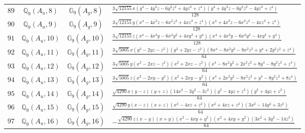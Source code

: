 \documentclass[fleqn,8pt,landscape]{jsarticle}
\begin{document}
\begin{table}[ht!]
\begin{center}
\begin{tabular}{cccl}
$ 89 $ & $ \mathbb{Q}_{9}(A_{u},8) $ & $ \mathbb{G}_{9}(A_{g},8) $ & $ \frac{3 \sqrt{12155} x \left(y^{4} - 4 y^{3} z - 6 y^{2} z^{2} + 4 y z^{3} + z^{4}\right) \left(y^{4} + 4 y^{3} z - 6 y^{2} z^{2} - 4 y z^{3} + z^{4}\right)}{128} $ \\
$ 90 $ & $ \mathbb{Q}_{9}(A_{u},9) $ & $ \mathbb{G}_{9}(A_{g},9) $ & $ \frac{3 \sqrt{12155} y \left(x^{4} - 4 x^{3} z - 6 x^{2} z^{2} + 4 x z^{3} + z^{4}\right) \left(x^{4} + 4 x^{3} z - 6 x^{2} z^{2} - 4 x z^{3} + z^{4}\right)}{128} $ \\
$ 91 $ & $ \mathbb{Q}_{9}(A_{u},10) $ & $ \mathbb{G}_{9}(A_{g},10) $ & $ \frac{3 \sqrt{12155} z \left(x^{4} - 4 x^{3} y - 6 x^{2} y^{2} + 4 x y^{3} + y^{4}\right) \left(x^{4} + 4 x^{3} y - 6 x^{2} y^{2} - 4 x y^{3} + y^{4}\right)}{128} $ \\
$ 92 $ & $ \mathbb{Q}_{9}(A_{u},11) $ & $ \mathbb{G}_{9}(A_{g},11) $ & $ \frac{3 \sqrt{5005} x \left(y^{2} - 2 y z - z^{2}\right) \left(y^{2} + 2 y z - z^{2}\right) \left(8 x^{4} - 8 x^{2} y^{2} - 8 x^{2} z^{2} + y^{4} + 2 y^{2} z^{2} + z^{4}\right)}{64} $ \\
$ 93 $ & $ \mathbb{Q}_{9}(A_{u},12) $ & $ \mathbb{G}_{9}(A_{g},12) $ & $ \frac{3 \sqrt{5005} y \left(x^{2} - 2 x z - z^{2}\right) \left(x^{2} + 2 x z - z^{2}\right) \left(x^{4} - 8 x^{2} y^{2} + 2 x^{2} z^{2} + 8 y^{4} - 8 y^{2} z^{2} + z^{4}\right)}{64} $ \\
$ 94 $ & $ \mathbb{Q}_{9}(A_{u},13) $ & $ \mathbb{G}_{9}(A_{g},13) $ & $ \frac{3 \sqrt{5005} z \left(x^{2} - 2 x y - y^{2}\right) \left(x^{2} + 2 x y - y^{2}\right) \left(x^{4} + 2 x^{2} y^{2} - 8 x^{2} z^{2} + y^{4} - 8 y^{2} z^{2} + 8 z^{4}\right)}{64} $ \\
$ 95 $ & $ \mathbb{Q}_{9}(A_{u},14) $ & $ \mathbb{G}_{9}(A_{g},14) $ & $ \frac{\sqrt{4290} x \left(y - z\right) \left(y + z\right) \left(14 x^{2} - 3 y^{2} - 3 z^{2}\right) \left(y^{2} - 4 y z + z^{2}\right) \left(y^{2} + 4 y z + z^{2}\right)}{64} $ \\
$ 96 $ & $ \mathbb{Q}_{9}(A_{u},15) $ & $ \mathbb{G}_{9}(A_{g},15) $ & $ \frac{\sqrt{4290} y \left(x - z\right) \left(x + z\right) \left(x^{2} - 4 x z + z^{2}\right) \left(x^{2} + 4 x z + z^{2}\right) \left(3 x^{2} - 14 y^{2} + 3 z^{2}\right)}{64} $ \\
$ 97 $ & $ \mathbb{Q}_{9}(A_{u},16) $ & $ \mathbb{G}_{9}(A_{g},16) $ & $ - \frac{\sqrt{4290} z \left(x - y\right) \left(x + y\right) \left(x^{2} - 4 x y + y^{2}\right) \left(x^{2} + 4 x y + y^{2}\right) \left(3 x^{2} + 3 y^{2} - 14 z^{2}\right)}{64} $ \\

\end{tabular}
\end{center}
\end{table}
\end{document}
